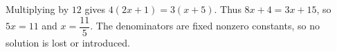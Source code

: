 Multiplying by $12$ gives $4(2x+1)=3(x+5)$. Thus $8x+4=3x+15$, so $5x=11$ and $\boxed{x=\dfrac{11}{5}}$. The denominators are fixed nonzero constants, so no solution is lost or introduced.

